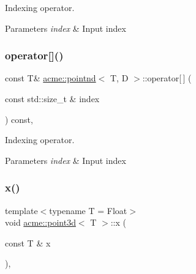 Indexing operator. 


\begin{DoxyParams}{Parameters}
{\em index} & Input index \\
\hline
\end{DoxyParams}
\mbox{\label{classacme_1_1pointnd_a565e9ed195c8f8dadc570a029a3deb94}} 
\subsubsection{\texorpdfstring{operator[]()}{operator[]()}\hspace{0.1cm}{\footnotesize\ttfamily [2/2]}}
{\footnotesize\ttfamily const T\& \hyperlink{classacme_1_1pointnd}{acme\+::pointnd}$<$ T, D $>$\+::operator\mbox{[}$\,$\mbox{]} (\begin{DoxyParamCaption}\item[{const std\+::size\+\_\+t \&}]{index }\end{DoxyParamCaption}) const\hspace{0.3cm}{\ttfamily [inline]}, {\ttfamily [inherited]}}



Indexing operator. 


\begin{DoxyParams}{Parameters}
{\em index} & Input index \\
\hline
\end{DoxyParams}
\mbox{\label{classacme_1_1point3d_acccc28f082747904be0f39bd5972a40e}} 
\subsubsection{\texorpdfstring{x()}{x()}}
{\footnotesize\ttfamily template$<$typename T = Float$>$ \\
void \hyperlink{classacme_1_1point3d}{acme\+::point3d}$<$ T $>$\+::x (\begin{DoxyParamCaption}\item[{const T \&}]{x }\end{DoxyParamCaption})\hspace{0.3cm}{\ttfamily [inline]}, {\ttfamily [inherited]}}



